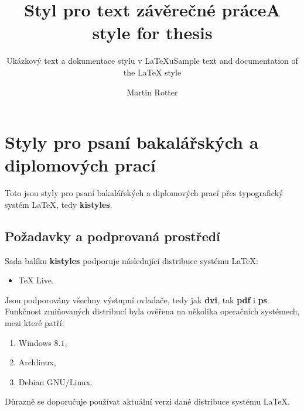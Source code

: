 \documentclass[
  biblatex,
  figures=false,
  glossaries,
  index
]{kidiplom}
\title{Styl pro text závěrečné práce}
\title[english]{A style for thesis}
\subtitle{Ukázkový text a dokumentace stylu v \LaTeX{}u}
\subtitle[english]{Sample text and documentation of the \LaTeX{} style}
\author{Martin Rotter}
\begin{document}
\maketitle



\newcommand{\BibLaTeX}{\textsc{Bib}\LaTeX}


\section{Styly pro psaní bakalářských a diplomových prací}
Toto jsou styly pro psaní bakalářských a diplomových prací přes typografický systém \LaTeX{}, tedy \textbf{kistyles}.

\subsection{Požadavky a podprovaná prostředí}
Sada balíku \textbf{kistyles} podporuje následující distribuce systému \LaTeX{}:
\begin{itemize}
\item \TeX{} Live.
\end{itemize}

Jsou podporovány všechny výstupní ovladače, tedy jak \textbf{dvi}, tak \textbf{pdf} i \textbf{ps}. Funkčnost zmiňovaných distribucí byla ověřena na několika operačních systémech, mezi které patří:
\begin{enumerate}
\item Windows $8.1$,
\item Archlinux,
\item Debian GNU/Linux.
\end{enumerate}

Důrazně se doporučuje používat aktuální verzi dané distribuce systému \LaTeX{}.

\end{document}
